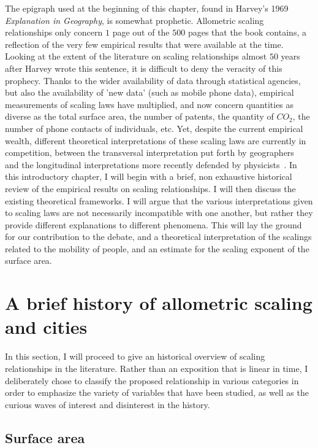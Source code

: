 The epigraph used at the beginning of this chapter, found in Harvey's 1969
\emph{Explanation in Geography}, is somewhat prophetic.  Allometric scaling
relationships only concern $1$ page out of the $500$ pages that the book
contains, a reflection of the very few empirical results that were available at
the time.  Looking at the extent of the literature on scaling relationships
almost $50$ years after Harvey wrote this sentence, it is difficult to deny the
veracity of this prophecy. Thanks to the wider availability of data through
statistical agencies, but also the availability of 'new data' (such as mobile
phone data), empirical measurements of scaling laws have multiplied,
and now concern quantities as diverse as the total surface area, the number of
patents, the quantity of $CO_2$, the number of phone contacts of individuals, etc. Yet, despite the current empirical wealth, different theoretical interpretations of these scaling laws are currently in competition, between the transversal interpretation put forth by geographers~\cite{Pumain:2006} and the longitudinal interpretations more recently defended by physicists~\cite{Bettencourt:2013, Louf:2014_smog}.  In this introductory chapter, I will begin with a brief, non exhaustive historical review of the empirical results on scaling relationships. I will then discuss the existing theoretical frameworks. I will argue that the various interpretations given to scaling laws are not necessarily incompatible with one another, but rather they provide different explanations to different phenomena.  This will lay the ground for our contribution to the debate, and a theoretical interpretation of the scalings related to the mobility of people, and an estimate for the scaling exponent of the surface area.  \section{A brief history of allometric scaling and cities} \label{sec:a_brief_history_of_allometric_scaling_and_cities} In this section, I will proceed to give an historical overview of scaling relationships in the literature. Rather than an exposition that is linear in time, I deliberately chose to classify the proposed relationship in various categories in order to emphasize the variety of variables that have been studied, as well as the curious waves of interest and disinterest in the history.  
\subsection{Surface area}
\label{sub:surface_area}

